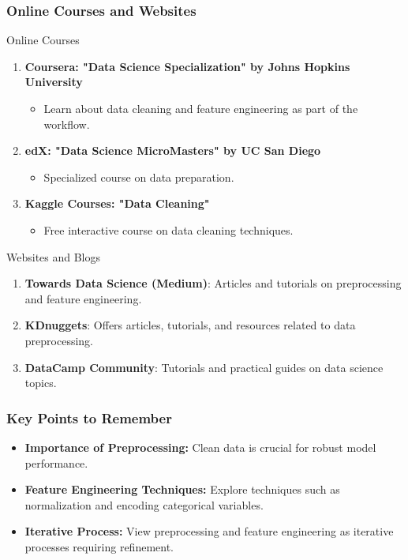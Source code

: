\documentclass[aspectratio=169]{beamer}
\begin{document}
\begin{frame}
    \frametitle{Online Courses and Websites}
    \begin{block}{Online Courses}
        \begin{enumerate}
            \item \textbf{Coursera: "Data Science Specialization" by Johns Hopkins University}
                \begin{itemize}
                    \item Learn about data cleaning and feature engineering as part of the workflow.
                \end{itemize}
            \item \textbf{edX: "Data Science MicroMasters" by UC San Diego}
                \begin{itemize}
                    \item Specialized course on data preparation.
                \end{itemize}
            \item \textbf{Kaggle Courses: "Data Cleaning"}
                \begin{itemize}
                    \item Free interactive course on data cleaning techniques.
                \end{itemize}
        \end{enumerate}
    \end{block}

    \begin{block}{Websites and Blogs}
        \begin{enumerate}
            \item \textbf{Towards Data Science (Medium)}: Articles and tutorials on preprocessing and feature engineering.
            \item \textbf{KDnuggets}: Offers articles, tutorials, and resources related to data preprocessing.
            \item \textbf{DataCamp Community}: Tutorials and practical guides on data science topics.
        \end{enumerate}
    \end{block}
\end{frame}

\begin{frame}[fragile]
    \frametitle{Key Points to Remember}
    \begin{itemize}
        \item \textbf{Importance of Preprocessing:} Clean data is crucial for robust model performance.
        \item \textbf{Feature Engineering Techniques:} Explore techniques such as normalization and encoding categorical variables.
        \item \textbf{Iterative Process:} View preprocessing and feature engineering as iterative processes requiring refinement.
    \end{itemize}
\end{frame}
\end{document}
